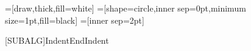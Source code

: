 \usepackage{rotating} %

\usepackage{xspace} %


\usepackage{tikz}
\usetikzlibrary{arrows}
\usetikzlibrary{patterns}
\usetikzlibrary{shapes}
\usetikzlibrary{shadows}
\usetikzlibrary{calc}
\usetikzlibrary{shapes.gates.logic.US}
=[draw,thick,fill=white]
=[shape=circle,inner sep=0pt,minimum size=1pt,fill=black]
=[inner sep=2pt]

\usepackage{import}
\usepackage{todonotes}


\renewcommand{\algorithmicrequire}{\textbf{Input:}}
\renewcommand{\algorithmicensure}{\textbf{Output:}}

[SUBALG]{Indent}{EndIndent}{}{\algorithmicend\ }%

\captionsetup{width=.8\textwidth}

\setcounter{MaxMatrixCols}{20} %

\usepackage[final]{pdfpages}